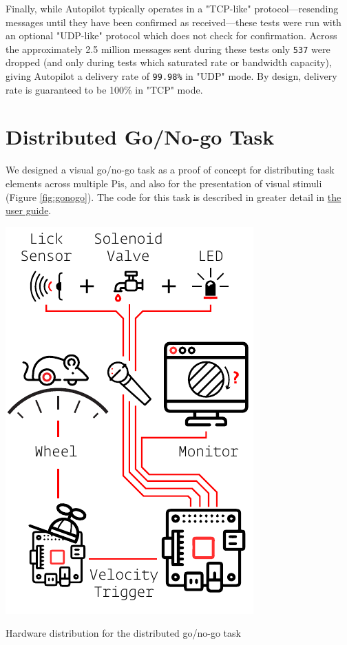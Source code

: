 \documentclass[nohyper, justified, notitlepage, marginals=raggedright,twoside=false,debug]{tufte-autopilot}
\begin{document}
Finally, while Autopilot typically operates in a "TCP-like" protocol---resending messages until they have been confirmed as received---these tests were run with an optional "UDP-like" protocol which does not check for confirmation. Across the approximately 2.5 million messages sent during these tests only \texttt{537} were dropped (and only during tests which saturated rate or bandwidth capacity), giving Autopilot a delivery rate of \texttt{99.98\%} in "UDP" mode. By design, delivery rate is guaranteed to be 100\% in "TCP" mode.

\section{Distributed Go/No-go Task}
\label{sec:gonogo}

We designed a visual go/no-go task as a proof of concept for distributing task elements across multiple Pis, and also for the presentation of visual stimuli (Figure \ref{fig:gonogo}). The code for this task is described in greater detail in \href{http://docs.auto-pi-lot.com/guide.task.html#distributed-go-no-go-using-child-agents}{the user guide}.

\begin{marginfigure}[-1.3cm]
\includegraphics[]{figures/test_5_gonogo.pdf}
\caption{Hardware distribution for the distributed go/no-go task}
\label{fig:gonogo}
\end{marginfigure}
\end{document}

